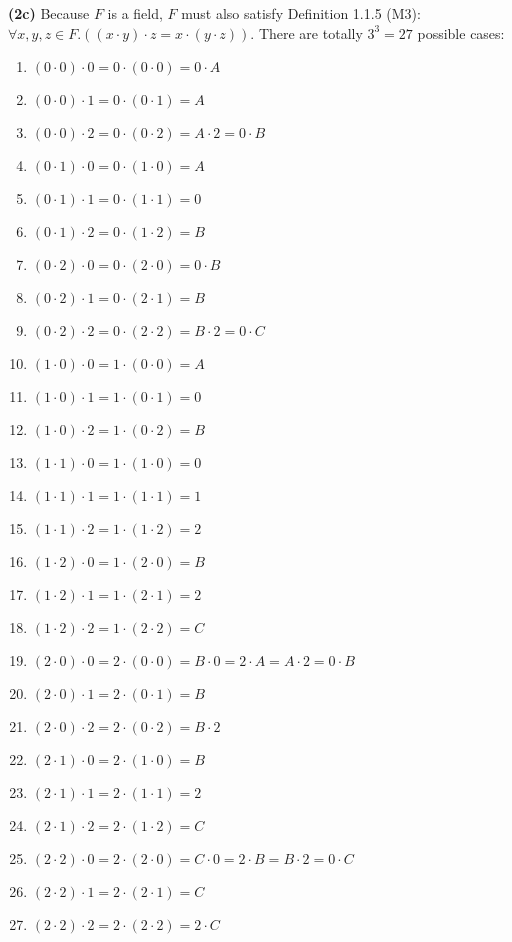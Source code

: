 \documentclass[12pt, letterpaper, oneside]{book}
\begin{document}
\textbf{(2c)} Because $F$ is a field, $F$ must also satisfy Definition 1.1.5 (M3): $\forall x, y, z \in F. ((x \cdot y)
  \cdot z = x \cdot (y \cdot z))$. There are totally $3^3 = 27$ possible cases:
\begin{enumerate}
  \item $(0 \cdot 0) \cdot 0 = 0 \cdot (0 \cdot 0) = 0 \cdot A$
  \item $(0 \cdot 0) \cdot 1 = 0 \cdot (0 \cdot 1) = A$
  \item $(0 \cdot 0) \cdot 2 = 0 \cdot (0 \cdot 2) = A \cdot 2 = 0 \cdot B$
  \item $(0 \cdot 1) \cdot 0 = 0 \cdot (1 \cdot 0) = A$
  \item $(0 \cdot 1) \cdot 1 = 0 \cdot (1 \cdot 1) = 0$
  \item $(0 \cdot 1) \cdot 2 = 0 \cdot (1 \cdot 2) = B$
  \item $(0 \cdot 2) \cdot 0 = 0 \cdot (2 \cdot 0) = 0 \cdot B$
  \item $(0 \cdot 2) \cdot 1 = 0 \cdot (2 \cdot 1) = B$
  \item $(0 \cdot 2) \cdot 2 = 0 \cdot (2 \cdot 2) = B \cdot 2 = 0 \cdot C$
  \item $(1 \cdot 0) \cdot 0 = 1 \cdot (0 \cdot 0) = A$
  \item $(1 \cdot 0) \cdot 1 = 1 \cdot (0 \cdot 1) = 0$
  \item $(1 \cdot 0) \cdot 2 = 1 \cdot (0 \cdot 2) = B$
  \item $(1 \cdot 1) \cdot 0 = 1 \cdot (1 \cdot 0) = 0$
  \item $(1 \cdot 1) \cdot 1 = 1 \cdot (1 \cdot 1) = 1$
  \item $(1 \cdot 1) \cdot 2 = 1 \cdot (1 \cdot 2) = 2$
  \item $(1 \cdot 2) \cdot 0 = 1 \cdot (2 \cdot 0) = B$
  \item $(1 \cdot 2) \cdot 1 = 1 \cdot (2 \cdot 1) = 2$
  \item $(1 \cdot 2) \cdot 2 = 1 \cdot (2 \cdot 2) = C$
  \item $(2 \cdot 0) \cdot 0 = 2 \cdot (0 \cdot 0) = B \cdot 0 = 2 \cdot A = A \cdot 2 = 0 \cdot B$
  \item $(2 \cdot 0) \cdot 1 = 2 \cdot (0 \cdot 1) = B$
  \item $(2 \cdot 0) \cdot 2 = 2 \cdot (0 \cdot 2) = B \cdot 2$
  \item $(2 \cdot 1) \cdot 0 = 2 \cdot (1 \cdot 0) = B$
  \item $(2 \cdot 1) \cdot 1 = 2 \cdot (1 \cdot 1) = 2$
  \item $(2 \cdot 1) \cdot 2 = 2 \cdot (1 \cdot 2) = C$
  \item $(2 \cdot 2) \cdot 0 = 2 \cdot (2 \cdot 0) = C \cdot 0 = 2 \cdot B = B \cdot 2 = 0 \cdot C$
  \item $(2 \cdot 2) \cdot 1 = 2 \cdot (2 \cdot 1) = C$
  \item $(2 \cdot 2) \cdot 2 = 2 \cdot (2 \cdot 2) = 2 \cdot C$
\end{enumerate}
\end{document}
